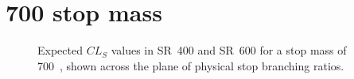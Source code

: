 \FloatBarrier

\newpage
\section{700 \texorpdfstring{\GeV}{GeV} stop mass}

\begin{figure}[ht]
  \centering
  \caption{
    Expected $CL_S$ values in SR~400 and SR~600 for a stop mass of 700~\GeV,
    shown across the plane of physical stop branching ratios.
  }
\end{figure}

